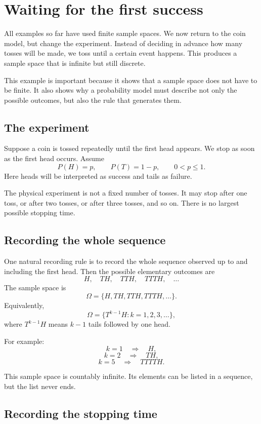 \section{Waiting for the first success}

All examples so far have used finite sample spaces. We now return to the coin
model, but change the experiment. Instead of deciding in advance how many tosses
will be made, we toss until a certain event happens. This produces a sample
space that is infinite but still discrete.

This example is important because it shows that a sample space does not have to
be finite. It also shows why a probability model must describe not only the
possible outcomes, but also the rule that generates them.

\subsection*{The experiment}

Suppose a coin is tossed repeatedly until the first head appears. We stop as
soon as the first head occurs. Assume
\[
P(H)=p,\qquad P(T)=1-p,\qquad 0<p\leq 1.
\]
Here heads will be interpreted as success and tails as failure.

The physical experiment is not a fixed number of tosses. It may stop after one
toss, or after two tosses, or after three tosses, and so on. There is no largest
possible stopping time.

\subsection*{Recording the whole sequence}

One natural recording rule is to record the whole sequence observed up to and
including the first head. Then the possible elementary outcomes are
\[
H,\quad TH,\quad TTH,\quad TTTH,\quad \ldots
\]
The sample space is
\[
\Omega=\{H,TH,TTH,TTTH,\ldots\}.
\]
Equivalently,
\[
\Omega=\{T^{k-1}H:k=1,2,3,\ldots\},
\]
where \(T^{k-1}H\) means \(k-1\) tails followed by one head.

For example:
\[
k=1 \quad\Rightarrow\quad H,
\]
\[
k=2 \quad\Rightarrow\quad TH,
\]
\[
k=5 \quad\Rightarrow\quad TTTTH.
\]

This sample space is countably infinite. Its elements can be listed in a
sequence, but the list never ends.

\subsection*{Recording the stopping time}


